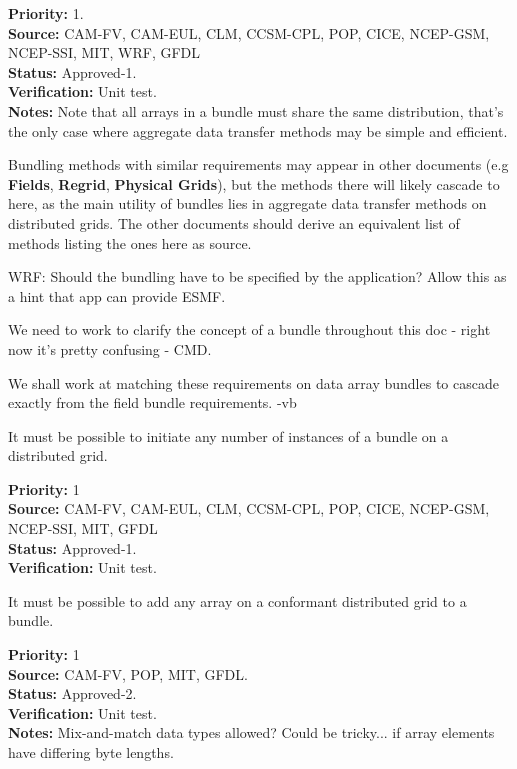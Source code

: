 \begin{reqlist}
{\bf Priority:} 1. \\ 
{\bf Source:} CAM-FV, CAM-EUL, CLM, CCSM-CPL, POP, CICE, NCEP-GSM, NCEP-SSI, MIT, WRF, GFDL \\
{\bf Status:} Approved-1. \\
{\bf Verification:} Unit test. \\
{\bf Notes:} Note that all arrays in a bundle must share the same
  distribution, that's the only case where aggregate data transfer
  methods may be simple and efficient.
  
  Bundling methods with similar requirements may appear in other
  documents (e.g \textbf{Fields}, \textbf{Regrid}, \textbf{Physical Grids}),
  but the methods there will likely cascade to here, as the main
  utility of bundles lies in aggregate data transfer methods on
  distributed grids. The other documents should derive an equivalent
  list of methods listing the ones here as source.

WRF: Should the bundling have to be specified by the application?  Allow this as a hint that app can provide ESMF.

We need to work to clarify the concept of a bundle throughout this doc -
right now it's pretty confusing - CMD.

We shall work at matching these requirements on data array bundles to
cascade exactly from the field bundle requirements. -vb
\end{reqlist}


It must be possible to initiate any number of instances of a bundle on
a distributed grid.

\begin{reqlist}
{\bf Priority:} 1 \\ 
{\bf Source:} CAM-FV, CAM-EUL, CLM, CCSM-CPL, POP, CICE, NCEP-GSM, NCEP-SSI, MIT, GFDL \\
{\bf Status:} Approved-1. \\
{\bf Verification:} Unit test. 
\end{reqlist}


It must be possible to add any array on a conformant distributed grid
to a bundle.

\begin{reqlist}
{\bf Priority:} 1 \\ 
{\bf Source:} CAM-FV, POP, MIT, GFDL. \\
{\bf Status:} Approved-2. \\
{\bf Verification:} Unit test. \\
{\bf Notes:} Mix-and-match data types allowed? Could be tricky... if
  array elements have differing byte lengths.
\end{reqlist}

